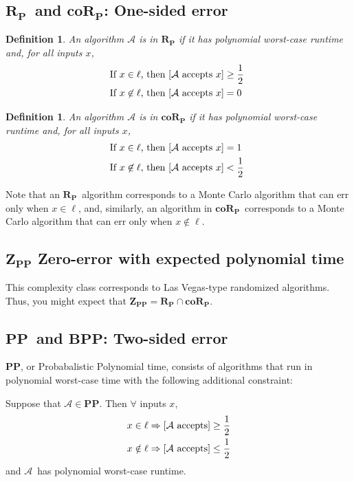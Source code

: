 \documentclass[11pt]{article}
\let\Pr\relax
\DeclareMathOperator*{\Pr}{\mathbb{P}}
\newcommand{\PP}{\ensuremath{\mathbf{PP}}}
\newcommand{\BPP}{\ensuremath{\mathbf{BPP}}}
\newcommand{\ZPP}{\ensuremath{\mathbf{Z_{PP}}}}
\newcommand{\RP}{\ensuremath{\mathbf{R_{P}}}}
\newcommand{\coRP}{\ensuremath{\mathbf{coR_{P}}}}
\newcommand{\Alg}{\ensuremath{\mathcal{A}}}
\newtheorem{definition}[theorem]{Definition}
\begin{document}
\subsection{\RP\ and \coRP: One-sided error }

\begin{definition}
An algorithm $\Alg$ is in $\RP$ if it has polynomial worst-case runtime and, for all inputs $x$,
\begin{align*}
  &\text{If $x \in \ell$, then $\Pr[\Alg \text{ accepts } x] \ge \frac12 $ } \\
  &\text{If $x \not\in \ell$, then $\Pr[\Alg \text{ accepts } x] = 0 $ }
\end{align*}
\end{definition}

\begin{definition}
An algorithm $\Alg$ is in $\coRP$ if it has polynomial worst-case runtime and, for all inputs $x$,
\begin{align*}
  &\text{If $x \in \ell$, then $\Pr[\Alg \text{ accepts } x] = 1 $ } \\
  &\text{If $x \not\in \ell$, then $\Pr[\Alg \text{ accepts } x] < \frac12 $ }
\end{align*}
\end{definition}

Note that an \RP\ algorithm corresponds to a Monte Carlo algorithm that can err only when $x \in \ell$, and, similarly, an algorithm in \coRP\ corresponds to a Monte Carlo algorithm that can err only when $x \notin \ell$.

\subsection{\ZPP\: Zero-error with expected polynomial time}

This complexity class corresponds to Las Vegas-type randomized algorithms. Thus, you might expect that $\ZPP = \RP \cap \coRP$.

\subsection{\PP\ and \BPP: Two-sided error }

\PP, or Probabalistic Polynomial time, consists of algorithms that run in polynomial worst-case time with the following additional constraint:

Suppose that $\Alg\in\PP$. Then $\forall$ inputs $x$,
\begin{align*}
  x \in \ell &\Rightarrow \Pr[\Alg \text{ accepts}] \ge \frac{1}{2} \\
  x \notin \ell &\Rightarrow \Pr[\Alg \text{ accepts}] \le \frac{1}{2} \\
\end{align*}
and \Alg\ has polynomial worst-case runtime.
\end{document}
